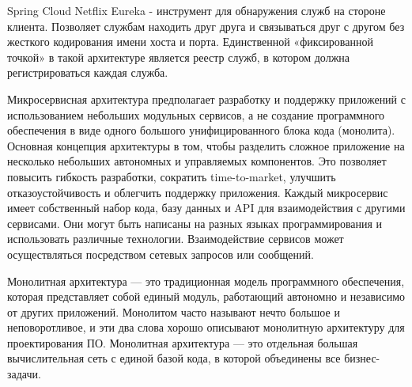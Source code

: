         Spring Cloud Netflix Eureka - инструмент для обнаружения служб на стороне клиента. Позволяет службам находить друг друга и связываться друг с другом без жесткого кодирования имени хоста и порта. Единственной «фиксированной точкой» в такой архитектуре является реестр служб, в котором должна регистрироваться каждая служба.

        Микросервисная архитектура предполагает разработку и поддержку приложений с использованием небольших модульных сервисов, а не создание программного обеспечения в виде одного большого унифицированного блока кода (монолита). Основная концепция архитектуры в том, чтобы разделить сложное приложение на несколько небольших автономных и управляемых компонентов. Это позволяет повысить гибкость разработки, сократить time-to-market, улучшить отказоустойчивость и облегчить поддержку приложения.
        Каждый микросервис имеет собственный набор кода, базу данных и API для взаимодействия с другими сервисами. Они могут быть написаны на разных языках программирования и использовать различные технологии. Взаимодействие сервисов может осуществляться посредством сетевых запросов или сообщений.

        Монолитная архитектура — это традиционная модель программного обеспечения, которая представляет собой единый модуль, работающий автономно и независимо от других приложений. Монолитом часто называют нечто большое и неповоротливое, и эти два слова хорошо описывают монолитную архитектуру для проектирования ПО. Монолитная архитектура — это отдельная большая вычислительная сеть с единой базой кода, в которой объединены все бизнес-задачи.


\clearpage